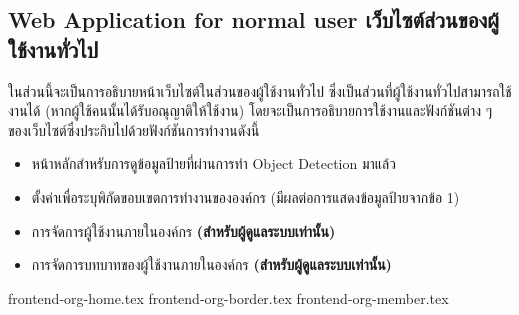 \clearpage
\subsection{\ifenglish Web Application for normal user \else เว็บไซต์ส่วนของผู้ใช้งานทั่วไป \fi}
\ifenglish \else
ในส่วนนี้จะเป็นการอธิบายหน้าเว็บไซต์ในส่วนของผู้ใช้งานทั่วไป ซึ่งเป็นส่วนที่ผู้ใช้งานทั่วไปสามารถใช้งานได้ (หากผู้ใช้คนนั้นได้รับอณุญาติให้ใช้งาน) โดยจะเป็นการอธิบายการใช้งานและฟังก์ชันต่าง ๆ ของเว็บไซต์ซึ่งประกิบไปด้วยฟังก์ชันการทำงานดังนี้
\begin{itemize}
    \item หน้าหลักสำหรับการดูข้อมูลป้ายที่ผ่านการทำ Object Detection มาแล้ว
    \item ตั้งค่าเพื่อระบุพิกัดขอบเขตการทำงานขององค์กร (มีผลต่อการแสดงข้อมูลป้ายจากข้อ 1)
    \item การจัดการผู้ใช้งานภายในองค์กร \textbf{(สำหรับผู้ดูแลระบบเท่านั้น)}
    \item การจัดการบทบาทของผู้ใช้งานภายในองค์กร \textbf{(สำหรับผู้ดูแลระบบเท่านั้น)}
\end{itemize}
\fi

{frontend-org-home.tex}
\clearpage
{frontend-org-border.tex}
\clearpage
{frontend-org-member.tex}